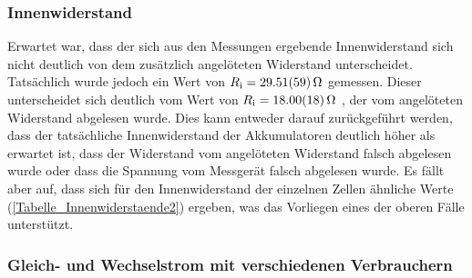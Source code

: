 \documentclass[
	a4paper,
	12pt,
	pagesize,
	ngerman
]{scrartcl}
\begin{document}
	\subsubsection{Innenwiderstand}
	Erwartet war, dass der sich aus den Messungen ergebende Innenwiderstand sich nicht deutlich von dem zusätzlich angelöteten Widerstand unterscheidet.
	Tatsächlich wurde jedoch ein Wert von $R_\text{i} = \SI{29,51 \pm 0,59}{\Omega}$ gemessen.
	Dieser unterscheidet sich deutlich vom Wert von $R_\text{i} = \SI{18 \pm 0,18}{\Omega}$ , der vom angelöteten Widerstand abgelesen wurde.
	Dies kann entweder darauf zurückgeführt werden, dass der tatsächliche Innenwiderstand der Akkumulatoren deutlich höher als erwartet ist, dass der Widerstand vom angelöteten Widerstand falsch abgelesen wurde oder dass die Spannung vom Messgerät falsch abgelesen wurde.
	Es fällt aber auf, dass sich für den Innenwiderstand der einzelnen Zellen ähnliche Werte (\cref{Tabelle_Innenwiderstaende2}) ergeben, was das Vorliegen eines der oberen Fälle unterstützt.
	
	\subsubsection{Gleich- und Wechselstrom mit verschiedenen Verbrauchern}
	
\end{document}
